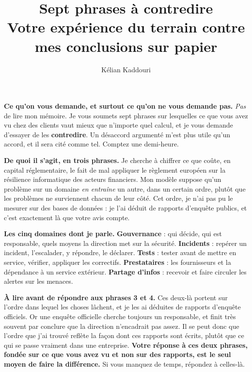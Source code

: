 \documentclass[11pt,a4paper]{article}
\title{\vspace{-1.2cm}\color{navy}\bfseries Sept phrases à contredire\\[2pt]
  \large Votre expérience du terrain contre mes conclusions sur papier}
\author{Kélian Kaddouri}
\date{}
\begin{document}
\maketitle
\vspace{-1.1cm}

\begin{cle}
\textbf{Ce qu'on vous demande, et surtout ce qu'on ne vous demande pas.} \emph{Pas} de lire mon
mémoire. Je vous soumets sept phrases sur lesquelles ce que vous avez vu chez des clients vaut
mieux que n'importe quel calcul, et je vous demande d'essayer de les \textbf{contredire}. Un
désaccord argumenté m'est plus utile qu'un accord, et il sera cité comme tel. Comptez une
demi-heure.
\end{cle}

\textbf{De quoi il s'agit, en trois phrases.} Je cherche à chiffrer ce que coûte, en capital
réglementaire, le fait de mal appliquer le règlement européen sur la résilience informatique des
acteurs financiers. Mon modèle suppose qu'un problème sur un domaine \emph{en entraîne} un autre,
dans un certain ordre, plutôt que les problèmes ne surviennent chacun de leur côté. Cet ordre,
je n'ai pas pu le mesurer sur des bases de données : je l'ai déduit de rapports d'enquête publics,
et c'est exactement là que votre avis compte.

\textbf{Les cinq domaines dont je parle.} \textbf{Gouvernance} : qui décide, qui est responsable,
quels moyens la direction met sur la sécurité. \textbf{Incidents} : repérer un incident,
l'escalader, y répondre, le déclarer. \textbf{Tests} : tester avant de mettre en service, vérifier,
appliquer les correctifs. \textbf{Prestataires} : les fournisseurs et la dépendance à un service
extérieur. \textbf{Partage d'infos} : recevoir et faire circuler les alertes sur les menaces.

\begin{cle}[colback=accent!7,colframe=accent!70!black]
\textbf{À lire avant de répondre aux phrases 3 et 4.} Ces deux-là portent sur l'ordre dans lequel
les choses lâchent, et je les ai déduites de rapports d'enquête officiels. Or une enquête
officielle cherche toujours un responsable, et finit très souvent par conclure que la direction
n'encadrait pas assez. Il se peut donc que l'ordre que j'ai trouvé reflète la façon dont ces
rapports sont écrits, plutôt que ce qui se passe vraiment dans une entreprise.
\textbf{Votre réponse à ces deux phrases, fondée sur ce que vous avez vu et non sur des rapports,
est le seul moyen de faire la différence.} Si vous manquez de temps, répondez à celles-là.
\end{cle}
\end{document}
